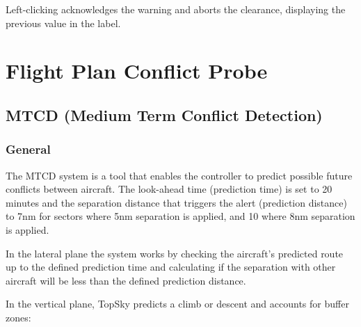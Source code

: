 \documentclass[a4paper,oneside,11pt]{memoir}
\begin{document}
\bigskip

Left-clicking acknowledges the warning and aborts the clearance, displaying the previous value in the label.

\section{Flight Plan Conflict Probe}


\subsection{MTCD (Medium Term Conflict Detection)}
\label{tool:MTCD}
\subsubsection*{General}

The MTCD system is a tool that enables the controller to predict possible future conflicts between aircraft. The look-ahead time (prediction time) is set to 20 minutes and the separation distance that triggers the alert (prediction distance) to 7nm for sectors where 5nm separation is applied, and 10 where 8nm separation is applied.

\bigskip

In the lateral plane the system works by checking the aircraft’s predicted route up to the defined prediction time and calculating if the separation with other aircraft will be less than the defined prediction distance.

\bigskip

In the vertical plane, TopSky predicts a climb or descent and accounts for buffer zones:

\end{document}
